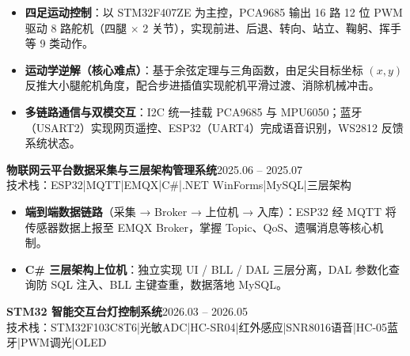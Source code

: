 \documentclass[10pt,a4paper]{article}
\newcommand{\projectblock}[3]{%
    {\bfseries\color{darktext}#1}\hfill{\color{graytext}#2}\\%
    {\small\color{graytext}#3}%
    \vspace{0.2em}%
}
\begin{document}
\begin{itemize}[leftmargin=1.5em, itemsep=2pt, parsep=0pt, topsep=2pt]
    \item \textbf{四足运动控制}：以 STM32F407ZE 为主控，PCA9685 输出 16 路 12 位 PWM 驱动 8 路舵机（四腿 $\times$ 2 关节），实现前进、后退、转向、站立、鞠躬、挥手等 9 类动作。
    \item \textbf{运动学逆解（核心难点）}：基于余弦定理与三角函数，由足尖目标坐标 $(x, y)$ 反推大小腿舵机角度，配合步进插值实现舵机平滑过渡、消除机械冲击。
    \item \textbf{多链路通信与双模交互}：I2C 统一挂载 PCA9685 与 MPU6050；蓝牙（USART2）实现网页遥控、ESP32（UART4）完成语音识别，WS2812 反馈系统状态。
\end{itemize}

\vspace{0.15em}

\projectblock{物联网云平台数据采集与三层架构管理系统}{2025.06 -- 2025.07}{技术栈：ESP32\hspace{0.3em}|\hspace{0.3em}MQTT\hspace{0.3em}|\hspace{0.3em}EMQX\hspace{0.3em}|\hspace{0.3em}C\#\hspace{0.3em}|\hspace{0.3em}.NET WinForms\hspace{0.3em}|\hspace{0.3em}MySQL\hspace{0.3em}|\hspace{0.3em}三层架构}

\begin{itemize}[leftmargin=1.5em, itemsep=2pt, parsep=0pt, topsep=2pt]
    \item \textbf{端到端数据链路}（采集 → Broker → 上位机 → 入库）：ESP32 经 MQTT 将传感器数据上报至 EMQX Broker，掌握 Topic、QoS、遗嘱消息等核心机制。
    \item \textbf{C\# 三层架构上位机}：独立实现 UI / BLL / DAL 三层分离，DAL 参数化查询防 SQL 注入、BLL 主键查重，数据落地 MySQL。
\end{itemize}

\vspace{0.15em}

\projectblock{STM32 智能交互台灯控制系统}{2026.03 -- 2026.05}{技术栈：STM32F103C8T6\hspace{0.3em}|\hspace{0.3em}光敏ADC\hspace{0.3em}|\hspace{0.3em}HC-SR04\hspace{0.3em}|\hspace{0.3em}红外感应\hspace{0.3em}|\hspace{0.3em}SNR8016语音\hspace{0.3em}|\hspace{0.3em}HC-05蓝牙\hspace{0.3em}|\hspace{0.3em}PWM调光\hspace{0.3em}|\hspace{0.3em}OLED}
\end{document}
